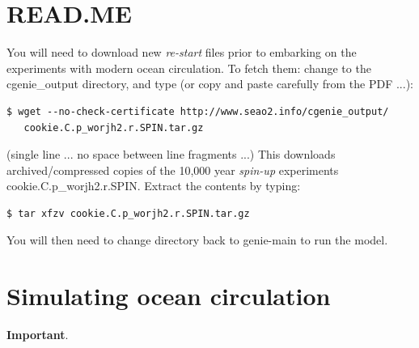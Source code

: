 \newpage

\section*{READ.ME}

You will need to download new \textit{re-start} files prior to embarking on the experiments with modern ocean circulation. To fetch them: change to the \textsf{\footnotesize cgenie\_output} directory, and type (or copy and paste carefully from the PDF ...):

\vspace{-2mm}\small\begin{verbatim}
$ wget --no-check-certificate http://www.seao2.info/cgenie_output/
   cookie.C.p_worjh2.r.SPIN.tar.gz
\end{verbatim}\normalsize\vspace{-2mm}
(single line ... no space between line fragments ...) This downloads  archived/compressed copies of the 10,000 year \textit{spin-up} experiments \textsf{\footnotesize cookie.C.p\_worjh2.r.SPIN}. Extract the contents by typing:

\vspace{-2mm}\small\begin{verbatim}
$ tar xfzv cookie.C.p_worjh2.r.SPIN.tar.gz
\end{verbatim}\normalsize\vspace{-2mm}
You will then need to change directory back to \textsf{\footnotesize genie-main} to run the model.

\newpage

\section{Simulating ocean circulation}

\textbf{Important}.

